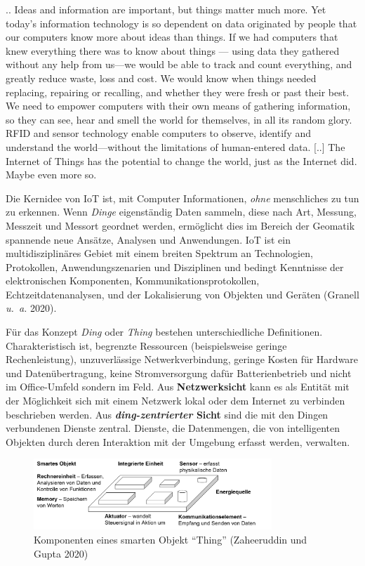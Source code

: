 \documentclass[
  11pt,
  a4paper,
  oneside, openany  ,captions=tableheading
]{scrbook}
\theoremstyle{remark}
\renewenvironment{quote}{\begin{customblockquote}\list{}{\rightmargin=0em\leftmargin=0em}%
\item\relax\color{blockquote-text}\ignorespaces}{\unskip\unskip\endlist\end{customblockquote}}
\begin{document}
\begin{quote}
.. Ideas and information are important, but things matter much more. Yet
today's information technology is so dependent on data originated by
people that our computers know more about ideas than things. If we had
computers that knew everything there was to know about things --- using
data they gathered without any help from us---we would be able to track
and count everything, and greatly reduce waste, loss and cost. We would
know when things needed replacing, repairing or recalling, and whether
they were fresh or past their best. We need to empower computers with
their own means of gathering information, so they can see, hear and
smell the world for themselves, in all its random glory. RFID and sensor
technology enable computers to observe, identify and understand the
world---without the limitations of human-entered data. {[}..{]} The
Internet of Things has the potential to change the world, just as the
Internet did. Maybe even more so.
\end{quote}

Die Kernidee von IoT ist, mit Computer Informationen, \emph{ohne}
menschliches zu tun zu erkennen. Wenn \emph{Dinge} eigenständig Daten
sammeln, diese nach Art, Messung, Messzeit und Messort geordnet werden,
ermöglicht dies im Bereich der Geomatik spannende neue Ansätze, Analysen
und Anwendungen. IoT ist ein multidisziplinäres Gebiet mit einem breiten
Spektrum an Technologien, Protokollen, Anwendungszenarien und
Disziplinen und bedingt Kenntnisse der elektronischen Komponenten,
Kommunikationsprotokollen, Echtzeitdatenanalysen, und der Lokalisierung
von Objekten und Geräten (Granell \emph{u.~a.} 2020).

Für das Konzept \emph{Ding} oder \emph{Thing} bestehen unterschiedliche
Definitionen. Charakteristisch ist, begrenzte Ressourcen (beispielsweise
geringe Rechenleistung), unzuverlässige Netwerkverbindung, geringe
Kosten für Hardware und Datenübertragung, keine Stromversorgung dafür
Batterienbetrieb und nicht im Office-Umfeld sondern im Feld. Aus
\textbf{Netzwerksicht} kann es als Entität mit der Möglichkeit sich mit
einem Netzwerk lokal oder dem Internet zu verbinden beschrieben werden.
Aus \textbf{\emph{ding-zentrierter} Sicht} sind die mit den Dingen
verbundenen Dienste zentral. Dienste, die Datenmengen, die von
intelligenten Objekten durch deren Interaktion mit der Umgebung erfasst
werden, verwalten.

\begin{figure}[H]

{\centering \includegraphics[width=0.8\textwidth,height=\textheight]{images/smartes_objekt.png}

}

\caption{Komponenten eines smarten Objekt ``Thing'' (Zaheeruddin und
Gupta 2020)}

\end{figure}%
\end{document}
